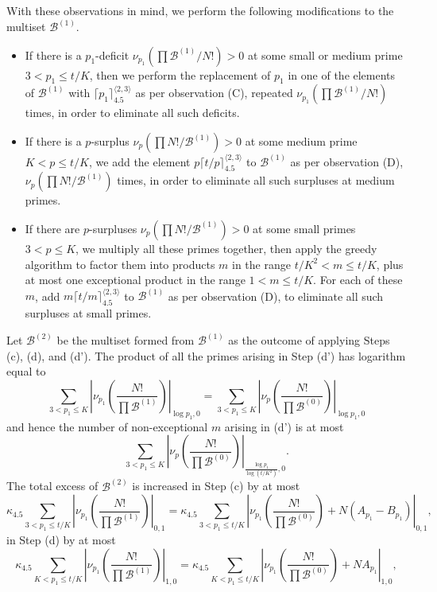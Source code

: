 \documentclass[10pt,a4paper,reqno]{amsart}
\numberwithin{equation}{section}
\theoremstyle{plain}
\theoremstyle{definition}
\newcommand\tuple{{\mathcal B}}
\begin{document}
With these observations in mind, we perform the following modifications to the multiset $\tuple^{(1)}$.
\begin{itemize}
\item[(c)] If there is a $p_1$-deficit $\nu_{p_1}(\prod \tuple^{(1)}/N!) > 0$ at some small or medium prime $3 < p_1 \leq t/K$, then we perform the replacement of $p_1$ in one of the elements of $\tuple^{(1)}$ with $\lceil p_1 \rceil^{\langle 2,3\rangle}_{4.5}$ as per observation (C), repeated $\nu_{p_1}(\prod \tuple^{(1)}/N!)$ times, in order to eliminate all such deficits.
\item[(d)] If there is a $p$-surplus $\nu_p(\prod N!/\tuple^{(1)}) > 0$ at some medium prime $K < p \leq t/K$, we add the element 
$p \lceil t/p \rceil^{\langle 2,3 \rangle}_{4.5}$ to $\tuple^{(1)}$ as per observation (D), $\nu_p(\prod N!/\tuple^{(1)})$ times, in order to eliminate all such surpluses at medium primes.
\item[(d')] If there are $p$-surpluses $\nu_p(\prod N!/\tuple^{(1)}) > 0$ at some small primes $3 < p \leq K$, we multiply all these primes together, then apply the greedy algorithm to factor them into products $m$ in the range $t/K^2 < m \leq t/K$, plus at most one exceptional product in the range $1 < m \leq t/K$.  For each of these $m$, add $m \lceil t/m \rceil^{\langle 2,3 \rangle}_{4.5}$ to $\tuple^{(1)}$ as per observation (D), to eliminate all such surpluses at small primes.
\end{itemize}
Let $\tuple^{(2)}$ be the multiset formed from $\tuple^{(1)}$ as the outcome of applying Steps (c), (d), and (d').  The product of all the primes arising in Step (d') has logarithm equal to
$$ \sum_{3 < p_1 \leq K} \left|\nu_{p_1}\left( \frac{N!}{\prod \tuple^{(1)}} \right) \right|_{\log p_1,0} = \sum_{3 < p_1 \leq K} \left|\nu_p\left( \frac{N!}{\prod \tuple^{(0)}} \right) \right|_{\log p_1,0}$$
and hence the number of non-exceptional $m$ arising in (d') is at most
$$ \sum_{3 < p_1 \leq K} \left|\nu_p\left( \frac{N!}{\prod \tuple^{(0)}} \right) \right|_{\frac{\log p_1}{\log(t/K^2)},0}.$$
The total excess of $\tuple^{(2)}$ is increased in Step (c) by at most
$$ \kappa_{4.5} \sum_{3 < p_1 \leq t/K} \left|\nu_{p_1}\left( \frac{N!}{\prod \tuple^{(1)}} \right) \right|_{0,1}
=  \kappa_{4.5} \sum_{3 < p_1 \leq t/K} \left|\nu_{p_1}\left( \frac{N!}{\prod \tuple^{(0)}} \right) + N(A_{p_1} - B_{p_1}) \right|_{0,1},$$
in Step (d) by at most
$$ \kappa_{4.5} \sum_{K < p_1 \leq t/K} \left|\nu_{p_1}\left( \frac{N!}{\prod \tuple^{(1)}} \right) \right|_{1,0}
=  \kappa_{4.5} \sum_{K < p_1 \leq t/K} \left|\nu_{p_1}\left( \frac{N!}{\prod \tuple^{(0)}} \right) + NA_{p_1} \right|_{1,0},$$
\end{document}
